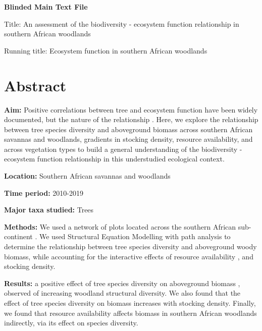 \documentclass[11pt,a4paper]{article}
\begin{document}
\newpage{}

{\LARGE{\textbf{Blinded Main Text File}}}

\LARGE{Title: An assessment of the biodiversity - ecosystem function relationship in southern African woodlands}

\normalsize{Running title: Ecosystem function in southern African woodlands}

\section{Abstract}

\textbf{Aim:} Positive correlations between tree  and ecosystem function have been widely documented, but the nature of the relationship .  Here, we explore the relationship between tree species diversity and aboveground biomass across southern African savannas and woodlands,  gradients in stocking density, resource availability, and across vegetation types to build a general understanding of the biodiversity - ecosystem function relationship in this understudied ecological context.

\textbf{Location:} Southern African savannas and woodlands

\textbf{Time period:} 2010-2019

\textbf{Major taxa studied:} Trees

\textbf{Methods:} We used a network of \nplots{}  plots located across the southern African sub-continent . We used Structural Equation Modelling with path analysis to determine the relationship between tree species diversity and aboveground woody biomass, while accounting for the interactive effects of resource availability , and stocking density.

\textbf{Results:}  a positive effect of tree species diversity on aboveground biomass , observed  of increasing woodland structural diversity. We also found that the effect of tree species diversity on biomass increases with stocking density. Finally, we found that resource availability affects biomass in southern African woodlands  indirectly, via its effect on species diversity.
\end{document}
